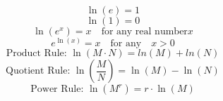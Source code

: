  \begin{tcolorbox}[title = {Review: Logarithmic Properties }]
\vspace{-0.8cm}
\begin{equation}
\ln(e) = 1
\end{equation}
\vspace{-0.8cm}
\begin{equation}
\ln(1) = 0
\end{equation}
\vspace{-0.8cm}
\begin{equation}
\ln(e^x) =x \quad \text{for any real number} x
\end{equation}
\vspace{-0.8cm}
\begin{equation}
e^{\ln(x)}=x \quad \text{for any} \quad x>0
\end{equation}
\vspace{-0.8cm}
\begin{equation}
\text{Product Rule: } \ln(M \cdot N)=ln(M) +ln(N)
\end{equation}
\vspace{-0.8cm}
\begin{equation}
\text{Quotient Rule: } \ln\left(\frac{M}{N}\right)=\ln(M) - \ln(N) 
\end{equation}
\vspace{-0.8cm}
\begin{equation}
\text{Power Rule: } \ln(M^r) = r \cdot \ln(M)
\end{equation}

\end{tcolorbox} 
